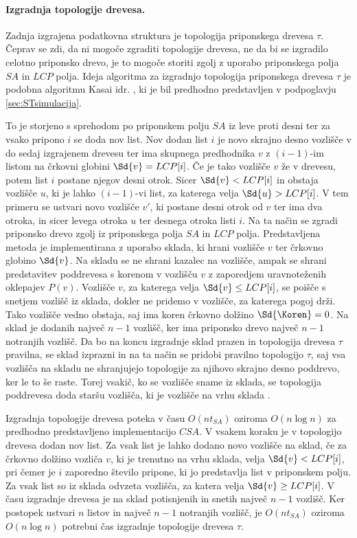 \paragraph{Izgradnja topologije drevesa.}
Zadnja izgrajena podatkovna struktura je topologija priponskega drevesa $\tau$. Čeprav se zdi, da ni mogoče zgraditi topologije drevesa, ne da bi se izgradilo celotno priponsko drevo, je to mogoče storiti zgolj z uporabo priponskega polja $SA$ in $LCP$ polja. Ideja algoritma za izgradnjo topologija priponskega drevesa $\tau$ je podobna algoritmu Kasai idr. \cite{Kasai2001}, ki je bil predhodno predstavljen v podpoglavju \ref{sec:STsimulacija}.

To je storjeno s sprehodom po priponskem polju $SA$ iz leve proti desni ter za vsako pripono $i$ se doda nov list. Nov dodan list $i$ je novo skrajno desno vozlišče v do sedaj izgrajenem drevesu ter ima skupnega predhodnika $v$ z $(i-1)$-im listom na črkovni globini $\Sd{v}=LCP[i]$. Če je tako vozlišče $v$ že v drevesu, potem list $i$ postane njegov desni otrok. Sicer $\Sd{v}<LCP[i]$ in obstaja vozlišče $u$, ki je lahko $(i-1)$-vi list, za katerega velja $\Sd{u}>LCP[i]$. V tem primeru se ustvari novo vozlišče $v'$, ki postane desni otrok od $v$ ter ima dva otroka, in sicer levega otroka $u$ ter desnega otroka listi $i$. Na ta način se zgradi priponsko drevo zgolj iz priponskega polja $SA$ in $LCP$ polja. Predstavljena metoda je implementirana z uporabo sklada, ki hrani vozlišče $v$ ter črkovno globino $\Sd{v}$. Na skladu se ne shrani kazalec na vozlišče, ampak se shrani predstavitev poddrevesa s korenom v vozlišču $v$ z zaporedjem uravnoteženih oklepajev $P(v)$. Vozlišče $v$, za katerega velja $\Sd{v}\le LCP[i]$, se poišče s snetjem vozlišč iz sklada, dokler ne pridemo v vozlišče, za katerega pogoj drži. Tako vozlišče vedno obstaja, saj ima koren črkovno dolžino $\Sd{\Koren}=0$. Na sklad je dodanih največ $n-1$ vozlišč, ker ima priponsko drevo največ $n-1$ notranjih vozlišč. Da bo na koncu izgradnje sklad prazen in topologija drevesa $\tau$ pravilna, se sklad izprazni in na ta način se pridobi pravilno topologijo $\tau$, saj vsa vozlišča na skladu ne shranjujejo topologije za njihovo skrajno desno poddrevo, ker le to še raste. Torej vsakič, ko se vozlišče sname iz sklada, se topologija poddrevesa doda staršu vozlišča, ki je vozlišče na vrhu sklada \cite{Navarro2016}.

Izgradnja topologije drevesa poteka v času $O(nt_{SA})$ oziroma $O(n\log{n})$ za predhodno predstavljeno implementacijo $CSA$. V vsakem koraku je v topologijo drevesa dodan nov list. Za vsak list je lahko dodano novo vozlišče na sklad, če za črkovno dolžino vozliča $v$, ki je trenutno na vrhu sklada, velja $\Sd{v}<LCP[i]$, pri čemer je $i$ zaporedno število pripone, ki jo predstavlja list v priponskem polju. Za vsak list so iz sklada odvzeta vozlišča, za katera velja $\Sd{v}\ge LCP[i]$. V času izgradnje drevesa je na sklad potisnjenih in snetih največ $n-1$ vozlišč. Ker postopek ustvari $n$ listov in največ $n-1$ notranjih vozlišč, je $O(nt_{SA})$ oziroma $O(n\log{n})$ potrebni čas izgradnje topologije drevesa $\tau$.

